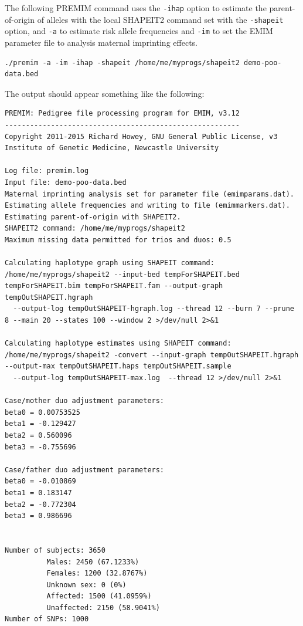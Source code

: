 \documentclass[a4paper,12pt]{article}
\newcommand{\code}[1]{{\footnotesize{{\tt #1}}}}
\begin{document}
The following PREMIM command uses the \code{-ihap} option to estimate the parent-of-origin of alleles with the local SHAPEIT2 command set with the \code{-shapeit} option, and \code{-a} to estimate risk allele frequencies and \code{-im} to set the EMIM parameter file to analysis maternal imprinting effects. 
\vspace{0.35cm} \begin{lstlisting}
./premim -a -im -ihap -shapeit /home/me/myprogs/shapeit2 demo-poo-data.bed 
\end{lstlisting} \vspace{0.35cm}
The output should appear something like the following: 
\vspace{0.35cm} \begin{lstlisting}
PREMIM: Pedigree file processing program for EMIM, v3.12
--------------------------------------------------------
Copyright 2011-2015 Richard Howey, GNU General Public License, v3
Institute of Genetic Medicine, Newcastle University

Log file: premim.log
Input file: demo-poo-data.bed
Maternal imprinting analysis set for parameter file (emimparams.dat).
Estimating allele frequencies and writing to file (emimmarkers.dat).
Estimating parent-of-origin with SHAPEIT2.
SHAPEIT2 command: /home/me/myprogs/shapeit2
Maximum missing data permitted for trios and duos: 0.5

Calculating haplotype graph using SHAPEIT command:
/home/me/myprogs/shapeit2 --input-bed tempForSHAPEIT.bed tempForSHAPEIT.bim tempForSHAPEIT.fam --output-graph tempOutSHAPEIT.hgraph 
  --output-log tempOutSHAPEIT-hgraph.log --thread 12 --burn 7 --prune 8 --main 20 --states 100 --window 2 >/dev/null 2>&1

Calculating haplotype estimates using SHAPEIT command:
/home/me/myprogs/shapeit2 -convert --input-graph tempOutSHAPEIT.hgraph --output-max tempOutSHAPEIT.haps tempOutSHAPEIT.sample 
  --output-log tempOutSHAPEIT-max.log  --thread 12 >/dev/null 2>&1

Case/mother duo adjustment parameters:
beta0 = 0.00753525
beta1 = -0.129427
beta2 = 0.560096
beta3 = -0.755696

Case/father duo adjustment parameters:
beta0 = -0.010869
beta1 = 0.183147
beta2 = -0.772304
beta3 = 0.986696


Number of subjects: 3650
          Males: 2450 (67.1233%)
          Females: 1200 (32.8767%)
          Unknown sex: 0 (0%)
          Affected: 1500 (41.0959%)
          Unaffected: 2150 (58.9041%)
Number of SNPs: 1000


\end{lstlisting}
\end{document}
